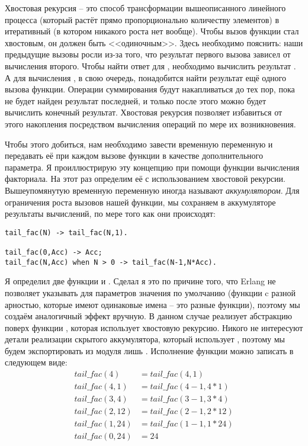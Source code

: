 Хвостовая рекурсия \--- это способ трансформации вышеописанного линейного процесса (который растёт прямо пропорционально количеству элементов) в итеративный (в котором никакого роста нет вообще).
Чтобы вызов функции стал хвостовым, он должен быть <<одиночным>>.
Здесь необходимо пояснить: наши предыдущие вызовы росли из\--за того, что результат первого вызова зависел от вычисления второго.
Чтобы найти ответ для , необходимо вычислить результат .
А для вычисления , в свою очередь, понадобится найти результат ещё одного вызова функции.
Операции суммирования будут накапливаться до тех пор, пока не будет найден результат последней, и только после этого можно будет вычислить конечный результат.
Хвостовая рекурсия позволяет избавиться от этого накопления посредством вычисления операций по мере их возникновения.

Чтобы этого добиться, нам необходимо завести временную переменную и передавать её при каждом вызове функции в качестве дополнительного параметра.
Я проиллюстрирую эту концепцию при помощи функции вычисления факториала.
На этот раз определим её с использованием хвостовой рекурсии.
Вышеупомянутую временную переменную иногда называют \emph{аккумулятором}.
Для ограничения роста вызовов нашей функции, мы сохраняем в аккумуляторе результаты вычислений, по мере того как они происходят:
\begin{lstlisting}[style=erlang]
tail_fac(N) -> tail_fac(N,1).
 
tail_fac(0,Acc) -> Acc;
tail_fac(N,Acc) when N > 0 -> tail_fac(N-1,N*Acc).
\end{lstlisting}

Я определил две функции  и .
Сделал я это по причине того, что Erlang не позволяет указывать для параметров значения по умолчанию (функции c разной арностью, которые имеют одинаковые имена \--- это разные функции), поэтому мы создаём аналогичный эффект вручную.
В данном случае  реализует абстракцию поверх функции , которая использует хвостовую рекурсию.
Никого не интересуют детали реализации скрытого аккумулятора, который использует , поэтому мы будем экспортировать из модуля лишь .
Исполнение функции можно записать в следующем виде:
\begin{align*}
tail\_fac(4) &= tail\_fac(4,1)\\
tail\_fac(4,1) &= tail\_fac(4-1, 4*1)\\
tail\_fac(3,4) &= tail\_fac(3-1, 3*4)\\
tail\_fac(2,12) &= tail\_fac(2-1,2*12)\\
tail\_fac(1,24) &= tail\_fac(1-1, 1*24)\\
tail\_fac(0,24) &= 24
\end{align*}

